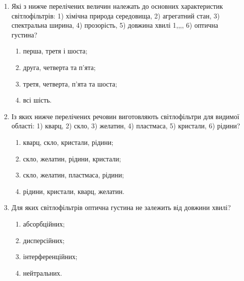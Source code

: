 \documentclass[onecolumn]{el-author}
\begin{document}
\begin{enumerate}
\begin{enumerate}
	\end{enumerate}
	\item Які з нижче перелічених величин належать до основних характеристик
світлофільтрів: 1) хімічна природа середовища, 2) агрегатний стан,
3) спектральна ширина, 4) прозорість, 5) довжина хвилі 1,,,, 6) оптична
густина?
	\begin{enumerate}
		\item перша, третя і шоста;
		\item друга, четверта та п'ята;
		\item третя, четверта, п'ята та шоста;
		\item всі шість.
	\end{enumerate}
	\item Із яких нижче перелічених речовин виготовляють світлофільтри для
видимої області: 1) кварц, 2) скло, 3) желатин, 4) пластмаса, 5) кристали,
6) рідини?
	\begin{enumerate}
		\item кварц, скло, кристали, рідини;
		\item  скло, желатин, рідини, кристали;
		\item скло, желатин, пластмаса, рідини;
		\item рідини, кристали, кварц, желатин.
	\end{enumerate}
	\item Для яких світлофільтрів оптична густина не залежить від довжини хвилі?
	\begin{enumerate}
		\item абсорбційних;
		\item дисперсійних;
		\item інтерференційних;
		\item нейтральних.
	\end{enumerate}
\end{enumerate}

\clearpage

\begin{figure}[h]
\caption{\source{}}
\label{img:1}
\end{figure}
\end{document}
